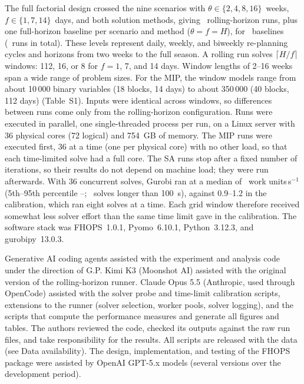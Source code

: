 The full factorial design crossed the nine scenarios with
$\theta \in \{2, 4, 8, 16\}$~weeks, $f \in \{1, 7, 14\}$~days, and both solution methods, giving
\NRollingRuns\ rolling-horizon runs, plus one full-horizon baseline per scenario and method
($\theta = f = H$), for \NBaselineRuns\ baselines (\NRuns\ runs in total). These levels represent
daily, weekly, and biweekly re-planning cycles and horizons from two weeks to the full season.
A rolling run solves $\lceil H/f \rceil$ windows: 112, 16, or 8 for $f = 1$, 7, and 14 days. Window
lengths of 2--16 weeks span a wide range of problem sizes. For the MIP, the window models range from
about 10\,000 binary variables (18 blocks, 14 days) to about 350\,000 (40 blocks, 112 days)
(Table~S1). Inputs were identical across
windows, so differences between runs come only from the rolling-horizon configuration. Runs were
executed in parallel, one single-threaded process per run, on a Linux server with 36 physical
cores (72 logical) and 754~GB of memory. The MIP runs were executed first, 36 at a time (one per physical
core) with no other load, so that each time-limited solve had a full core. The SA runs stop after a
fixed number of iterations, so their results do not depend on machine load; they were run
afterwards. With 36 concurrent solves, Gurobi
ran at a median of \GurobiWorkRateMedian\ work units\,s$^{-1}$ (5th--95th percentile
\GurobiWorkRateLow--\GurobiWorkRateHigh; \GurobiSolvesLogged\ solves longer than 100~s), against
0.9--1.2 in the calibration, which ran eight solves at a time. Each grid window therefore received
somewhat less solver effort than the same time limit gave in the calibration. The software stack was FHOPS~1.0.1,
Pyomo~6.10.1, Python~3.12.3, and gurobipy~13.0.3.

Generative AI coding agents assisted with the experiment and analysis code under the direction of
G.P. Kimi K3 (Moonshot AI) assisted with the original version of the rolling-horizon runner.
Claude Opus 5.5 (Anthropic, used through OpenCode) assisted with the solver probe and time-limit
calibration scripts, extensions to the runner (solver selection, worker pools, solver logging),
and the scripts that compute the performance measures and generate all figures and tables. The authors reviewed the code, checked
its outputs against the raw run files, and take responsibility for the results. All scripts are
released with the data (see Data availability). The design, implementation, and testing of the FHOPS package were assisted by OpenAI GPT-5.x
models (several versions over the development period).

